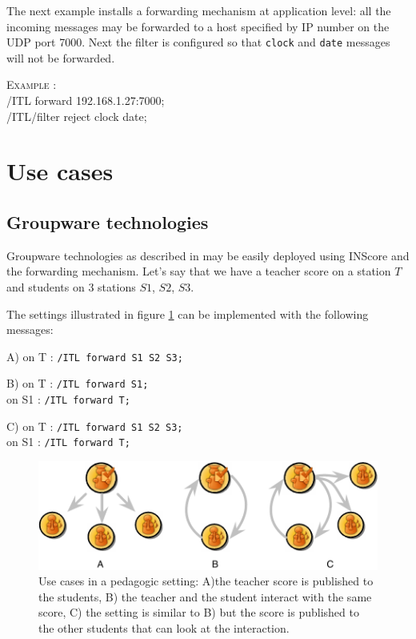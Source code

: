 \documentclass{article}
\newcounter{samplenum}
\newcommand{\code}[1]		{{\small \texttt{#1}}}
\newcommand{\sample}[1]		{ 	
								\begin{center}\colorbox{mygrey}{
								\begin{minipage}[t]{0.99\columnwidth} 
								\textsc{Example} \arabic{samplenum}: \vspace{1mm} \\
								\ttfamily \small #1  
								\end{minipage}}\end{center}
								\stepcounter{samplenum}
							}
\newcommand{\hspa}			{ \hspace*{0.8mm}  }
\begin{document}
The next example installs a forwarding mechanism at application level: all the incoming messages may be forwarded to a host specified by IP number on the UDP port 7000. Next the filter is configured so that \code{clock} and \code{date} messages will not be forwarded.
\sample{
  /ITL forward 192.168.1.27:7000;\\
  /ITL/filter reject clock date; 
}


\section{Use cases}

\subsection{Groupware technologies}
Groupware technologies as described in \cite{Fober:07b} may be easily deployed using INScore and the forwarding mechanism. Let's say that we have a teacher score on a station $T$ and students on 3 stations $S1$, $S2$, $S3$.

The settings illustrated in figure \ref{fig:groupware} can be implemented with the following messages:
\begin{description}
\item A) \hspa on  T : \code{/ITL forward S1 S2 S3;}
\item B) \hspa on  T : \code{/ITL forward S1;}\\
on  S1 : \code{/ITL forward T;}
\item C) \hspa on  T : \code{/ITL forward S1 S2 S3;}\\
on  S1 : \code{/ITL forward T;}
\end{description}

\begin{figure}[h]
\centering
\includegraphics[width=0.95\columnwidth]{img/groupware}
\caption{Use cases in a pedagogic setting: A)the teacher score is published to the students, B) the teacher and the student interact with the same score, C) the setting is similar to B) but the score is published to the other students that can look at the interaction.}
\label{fig:groupware}
\end{figure}
\end{document}
